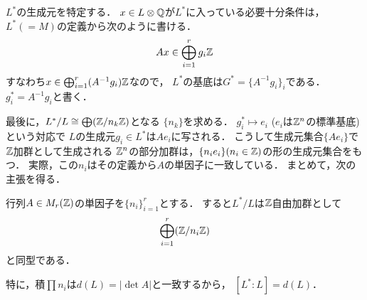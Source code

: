 \documentclass[a4paper]{jsarticle}
\begin{document}
    $L^*$の生成元を特定する．
    $x \in L \otimes \mathbb{Q}$が$L^*$に入っている必要十分条件は，
    $L^*(=M)$の定義から次のように書ける．
    \[ Ax \in \bigoplus_{i=1}^r g_i \mathbb{Z} \]
    すなわち$x \in \bigoplus_{i=1}^r (A^{-1}g_i)\mathbb{Z}$なので，
    $L^*$の基底は$G^*=\{ A^{-1}g_i \}_i$である．
    $g^*_i=A^{-1}g_i$と書く．

    最後に，$L^*/L \cong \bigoplus (\mathbb{Z}/n_k\mathbb{Z})$となる
    $\{ n_k \}$を求める．
    $g^*_i \mapsto e_i$ ($e_i$は$\mathbb{Z}^n$の標準基底)という対応で
    $L$の生成元$g_i \in L^*$は$Ae_i$に写される．
    こうして生成元集合$\{Ae_i\}$で$\mathbb{Z}$加群として生成される
    $\mathbb{Z}^n$の部分加群は，$\{ n_i e_i \} (n_i \in \mathbb{Z})$の形の生成元集合をもつ．
    実際，この$n_i$はその定義から$A$の単因子に一致している．
    まとめて，次の主張を得る．
    \begin{Claim}
        行列$A \in M_r(\mathbb{Z})$の単因子を$\{ n_i \}_{i=1}^r$とする．
        すると$L^*/L$は$\mathbb{Z}$自由加群として
        \[ \bigoplus_{i=1}^r (\mathbb{Z}/n_i \mathbb{Z}) \]
        と同型である．
    \end{Claim}
    特に，積$\prod n_i$は$d(L)=|\det A|$と一致するから，
    $[L^*:L]=d(L)$．
\end{document}
